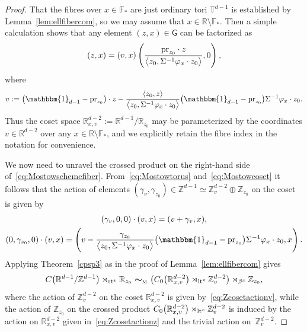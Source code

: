 \documentclass[pdftex]{sigma}
\numberwithin{equation}{section}
\newcommand{\Z}{\zed}
\newcommand{\F}{\mathbb{F}}
\newcommand{\mbf}[1]{{\boldsymbol {#1} }}
\newcommand{\unit}{\mathbbm{1}} 			%
\newcommand{\sfG}{\mathsf{G}}
\newcommand{\lt}{{\rm lt}}
\newcommand{\rt}{{\rm rt}}
\newcommand{\R}{\real}
\newcommand{\zed}{{\mathbb Z}} %
\newcommand{\real}{{\mathbb R}} %
\newcommand{\torus}{{\mathbb T}} %
\newcommand{\proj}{{\rm pr}}
\begin{document}
\begin{proof}
That the fibres over $x\in\F_*$ are just ordinary tori $\torus^{d-1}$
is established by Lemma~\ref{lem:ellfibercom}, so we may assume that $x\in\R\setminus\F_*$. Then a simple
calculation shows that any element $(z,x)\in\sfG$ can be factorized as
\[
(z,x) = (v,x) \left(\frac{\proj_{ z_0}\cdot z}{\big\langle z_0,\Sigma^{-1} \varphi_x\cdot z_0\big\rangle} , 0\right) ,
\]
where
\begin{gather}\label{eq:Mostowcoset}
v:=\big(\unit_{d-1}-\proj_{ z_0}\big)\cdot z - \frac{\langle{ z_0},
 z\rangle}{\big\langle{ z_0},\Sigma^{-1} \varphi_x\cdot z_0\big\rangle}
\big(\unit_{d-1}-\proj_{ z_0}\big) \Sigma^{-1} \varphi_x\cdot z_0 .
\end{gather}
Thus the coset space $\R_{x,v}^{d-2}:=\R^{d-1}/\R_{ z_0}$ may be
parameterized by the coordinates $v\in\R^{d-2}$ over any
$x\in\R\setminus\F_*$, and we explicitly retain the fibre index in the
notation for convenience.

We now need to unravel the crossed product
on the right-hand side of~\eqref{eq:Mostowschemefiber}.
From~\eqref{eq:Mostowtorus} and~\eqref{eq:Mostowcoset} it follows that the action of elements
$(\gamma_v,\gamma_{ z_0})\in\Z^{d-1}\simeq\Z_v^{d-2}\oplus\Z_{
 z_0}$ on the coset is given by
\begin{gather}\label{eq:Zcosetactionv}
(\gamma_v,0,0)\cdot (v,x) = (v+\gamma_v,x) , \\
(0,\gamma_{ z_0},0)\cdot (v,x) = \left(v-\frac{
 \gamma_{ z_0}}{\big\langle{ z_0},\Sigma^{-1} \varphi_x\cdot z_0\big\rangle}
\big(\unit_{d-1}-\proj_{ z_0}\big) \Sigma^{-1} \varphi_x\cdot
 z_0 , x\right) .
\label{eq:Zcosetactionz}\end{gather}
Applying
Theorem~\ref{cpsp3} as in the proof of Lemma~\ref{lem:ellfibercom} gives
\begin{gather*}%
C\big(\R^{d-1}/\Z^{d-1}\big)\rtimes_{\rt^x}\real_{ z_0}
\ \mbf\sim_{\text{\tiny M}} \
\big(C_0\big(\real^{d-2}_{x,v}\big)\rtimes_{\lt^x}\Z^{d-2}_{v}\big) \rtimes_{\beta^x} \Z_{ z_0} ,
\end{gather*}
where the action of $\Z^{d-2}_v$ on the coset $\R^{d-2}_{x,v}$ is
given by~\eqref{eq:Zcosetactionv}, while the action of $\Z_{ z_0}$ on the crossed product
$C_0\big(\real^{d-2}_{x,v}\big)\rtimes_{\lt^x}\Z^{d-2}_{v}$ is induced by the
action on $\real^{d-2}_{x,v}$ given in~\eqref{eq:Zcosetactionz} and the trivial action on~$\Z^{d-2}_{v}$.


\end{proof}
\end{document}

